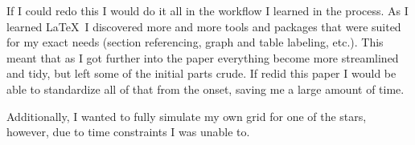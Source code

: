 \documentclass[12pt, a4paper]{article}
\begin{document}
    If I could redo this I would do it all in the workflow I learned in the process. As I learned \LaTeX~I discovered more and more tools and packages that were suited for my exact needs (section referencing, graph and table labeling, etc.). This meant that as I got further into the paper everything become more streamlined and tidy, but left some of the initial parts crude. If redid this paper I would be able to standardize all of that from the onset, saving me a large amount of time.

    Additionally, I wanted to fully simulate my own grid for one of the stars, however, due to time constraints I was unable to. 
\end{document}
